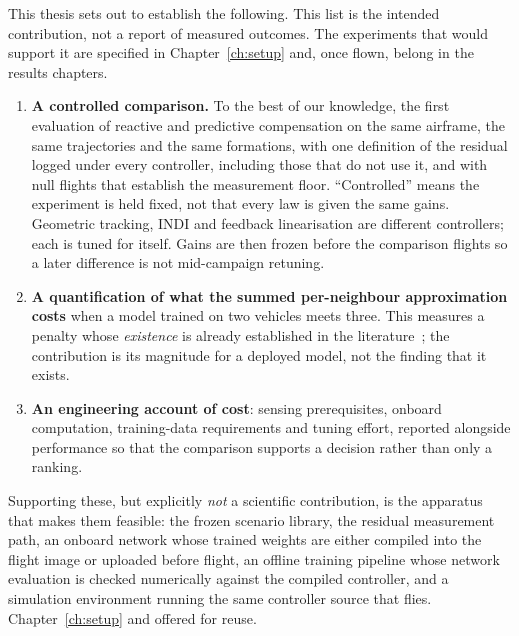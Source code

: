 This thesis sets out to establish the following. This list is the intended contribution, not a
report of measured outcomes. The experiments that would support it are specified in
Chapter~\ref{ch:setup} and, once flown, belong in the results chapters.

\begin{enumerate}
  \item \textbf{A controlled comparison.} To the best of our knowledge, the first evaluation of
    reactive and predictive compensation on the same airframe, the same trajectories and the same
    formations, with one definition of the residual logged under every controller, including those
    that do not use it, and with null flights that establish the measurement floor.
    ``Controlled'' means the experiment is held fixed, not that every law is given the same gains.
    Geometric tracking, INDI and feedback linearisation are different controllers; each is tuned for
    itself. Gains are then frozen before the comparison flights so a later difference is not
    mid-campaign retuning.

  \item \textbf{A quantification of what the summed per-neighbour approximation costs} when a
    model trained on two vehicles meets three. This measures a penalty whose \emph{existence} is
    already established in the literature~\cite{shi2020neuralswarm,gielis2023aggregate}; the
    contribution is its magnitude for a deployed model, not the finding that it exists.

  \item \textbf{An engineering account of cost}: sensing prerequisites, onboard computation,
    training-data requirements and tuning effort, reported alongside performance so that the comparison supports a
    decision rather than only a ranking.

\end{enumerate}

Supporting these, but explicitly \emph{not} a scientific contribution, is the apparatus that makes
them feasible: the frozen scenario library, the residual measurement path, an onboard network whose
trained weights are either compiled into the flight image or uploaded before flight, an offline
training pipeline whose network evaluation is checked numerically against the compiled controller,
and a simulation environment running the same controller source that flies.
Chapter~\ref{ch:setup} and offered for reuse.

